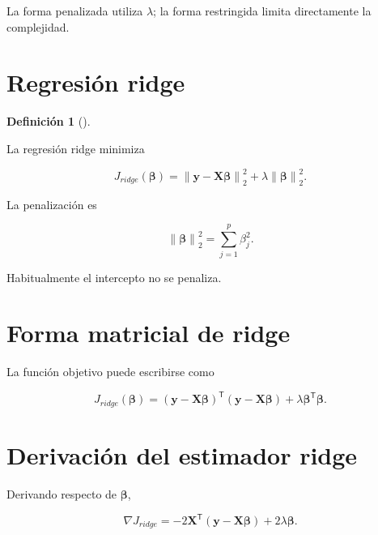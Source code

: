 \documentclass[
  spanish,
  10.5pt,
  letterpaper,
  DIV=11,
  numbers=noendperiod,
  oneside,
  open=any]{scrreprt}
\theoremstyle{definition}
\newtheorem{definition}{Definición}[chapter]
\theoremstyle{definition}
\theoremstyle{plain}
\theoremstyle{remark}
\begin{document}
La forma penalizada utiliza \(\lambda\); la forma restringida limita
directamente la complejidad.

\section*{Regresión ridge}\label{regresiuxf3n-ridge}


\begin{definition}[]\protect\hypertarget{def-ridge}{}\label{def-ridge}

La regresión ridge minimiza

\[
J_{ridge}(\boldsymbol{\beta})
=
\left\|
\mathbf{y}
-
\mathbf{X}\boldsymbol{\beta}
\right\|_2^2
+
\lambda
\left\|
\boldsymbol{\beta}
\right\|_2^2.
\]

\end{definition}

La penalización es

\[
\left\|
\boldsymbol{\beta}
\right\|_2^2
=
\sum_{j=1}^{p}
\beta_j^2.
\]

Habitualmente el intercepto no se penaliza.

\section*{Forma matricial de ridge}\label{forma-matricial-de-ridge}


La función objetivo puede escribirse como

\[
J_{ridge}(\boldsymbol{\beta})
=
(\mathbf{y}-\mathbf{X}\boldsymbol{\beta})^{\mathsf T}
(\mathbf{y}-\mathbf{X}\boldsymbol{\beta})
+
\lambda
\boldsymbol{\beta}^{\mathsf T}\boldsymbol{\beta}.
\]

\section*{Derivación del estimador
ridge}\label{derivaciuxf3n-del-estimador-ridge}


Derivando respecto de \(\boldsymbol{\beta}\),

\[
\nabla J_{ridge}
=
-2\mathbf{X}^{\mathsf T}
(\mathbf{y}-\mathbf{X}\boldsymbol{\beta})
+
2\lambda\boldsymbol{\beta}.
\]
\end{document}
